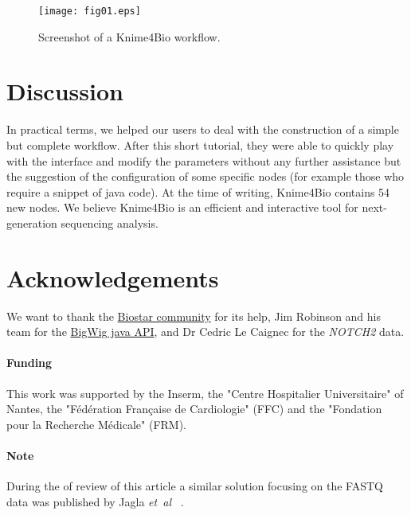 \documentclass{bioinfo}
\begin{document}
\begin{figure}[!tpb]%
\centerline{\texttt{[image: fig01.eps]}}
\caption{Screenshot of a Knime4Bio workflow.}\label{fig:x1}
\end{figure}

\section{Discussion}
In practical terms, we helped our users to deal with the construction of a simple but complete workflow. After this short tutorial, they were able to quickly play with the interface and modify the parameters without any further assistance but the suggestion of the configuration of some specific nodes (for example those who require a snippet of java code).  At the time of writing, Knime4Bio contains 54 new nodes. We believe Knime4Bio is an efficient and interactive tool for next-generation sequencing analysis.

\section*{Acknowledgements}
We want to thank the  \href{http://biostar.stackexchange.com/}{Biostar community} for its help, Jim Robinson and his team for the \href{http://code.google.com/p/bigwig/}{BigWig java API}, and Dr Cedric Le Caignec for the \textit{NOTCH2} data.

\paragraph{Funding\textcolon} This work was supported by the Inserm, the "Centre Hospitalier Universitaire" of Nantes, the "F\'{e}d\'{e}ration Fran\c{c}aise de Cardiologie" (FFC) and the "Fondation pour la Recherche M\'{e}dicale" (FRM).

\paragraph{Note\textcolon} During the of review of this article a similar solution focusing on the FASTQ data was published by Jagla \textit{et~al} ~\citep{pmid21873641}.
\\


\end{document}
